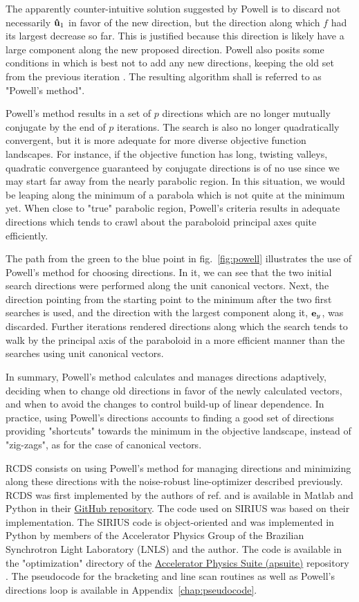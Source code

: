 The apparently counter-intuitive solution suggested by Powell is to discard not necessarily $\vu{u}_1$ in favor of the new direction, but the direction along which $f$ had its largest decrease so far. This is justified because this direction is likely have a large component along the new proposed  direction. Powell also posits some conditions in which is best not to add any new directions, keeping the old set from the previous iteration \cite[section 10.7]{press_numerical_2007}. The resulting algorithm shall is referred to as "Powell's method".

Powell's method results in a set of $p$ directions which are no longer mutually conjugate by the end of $p$ iterations. The search is also no longer quadratically convergent, but it is more adequate for more diverse objective function landscapes. For instance, if the objective function has long, twisting valleys, quadratic convergence guaranteed by conjugate directions is of no use since we  may start far away from the nearly parabolic region. In this situation, we would be leaping along the minimum of a parabola which is not quite at the minimum yet. When close to "true" parabolic region, Powell's criteria results in adequate directions which tends to crawl about the paraboloid principal axes quite efficiently.

The path from the green to the blue point in fig.~\ref{fig:powell} illustrates the use of Powell's method for choosing directions. In it, we can see that the two initial search directions were performed along the unit canonical vectors. Next, the direction pointing from the starting point to the minimum after the two first searches is used, and the direction with the largest component along it, $\vb{e}_y$, was discarded. Further iterations rendered directions along which the search tends to walk by the principal axis of the paraboloid in a more efficient manner than the searches using unit canonical vectors.

In summary, Powell's method calculates and manages directions adaptively, deciding when to change old directions in favor of the newly calculated  vectors, and when to avoid the changes to control build-up of linear dependence. In practice, using Powell's directions accounts to finding a good set of directions providing "shortcuts" towards the minimum in the objective landscape, instead of "zig-zags", as for the case of canonical vectors.

RCDS consists on using Powell's method for managing directions and minimizing along these directions with the noise-robust line-optimizer described previously. RCDS was first implemented by the authors of ref.\cite{huang_algorithm_2013} and is available in Matlab and Python in their \href{https://github.com/SPEAR3-ML/RCDS}{GitHub repository}. The code used on SIRIUS was based on their implementation. The SIRIUS code is object-oriented and was  implemented in Python by members of the Accelerator Physics Group of the Brazilian Synchrotron Light Laboratory (LNLS) and the author. The code is available in the "optimization" directory of the \href{https://github.com/lnls-fac/apsuite}{Accelerator Physics Suite (apsuite)} repository \cite{apsuite}. The pseudocode for the bracketing and line scan routines as well as Powell's directions loop is available in Appendix~\ref{chap:pseudocode}.

